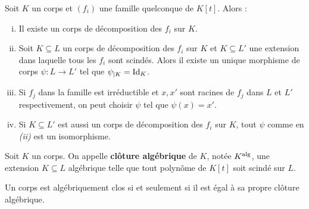 
	\begin{pop}
		Soit $K$ un corps et $(f_i)$ une famille quelconque de $K[t]$. Alors :
		\begin{enumerate}[(i)]
			\item Il existe un corps de décomposition des $f_i$ sur $K$.
			\item Soit $K \subseteq L$ un corps de décomposition des $f_i$ sur $K$ et $K \subseteq L'$ une extension dans laquelle tous les $f_i$ sont scindés.
				Alors il existe un unique morphisme de corps $\psi \colon L \to L'$ tel que $\psi_{|K} = \operatorname{Id}_K$.
			\item Si $f_j$ dans la famille est irréductible et $x,x'$ sont racines de $f_j$ dans $L$ et $L'$ respectivement, on peut choisir $\psi$ tel que $\psi(x) = x'$.
			\item Si $K \subseteq L'$ est aussi un corps de décomposition des $f_i$ sur $K$, tout $\psi$ comme en \textit{(ii)} est un isomorphisme.
		\end{enumerate}
	\end{pop}

	\begin{defn}
		Soit $K$ un corps.
		On appelle \textbf{clôture algébrique} de $K$, notée $K^{\operatorname{alg}}$, une extension $K \subseteq L$ algébrique telle que tout polynôme de $K[t]$ soit scindé sur $L$.
	\end{defn}

	\begin{rem}
		Un corps est algébriquement clos si et seulement si il est égal à sa propre clôture algébrique.
	\end{rem}

